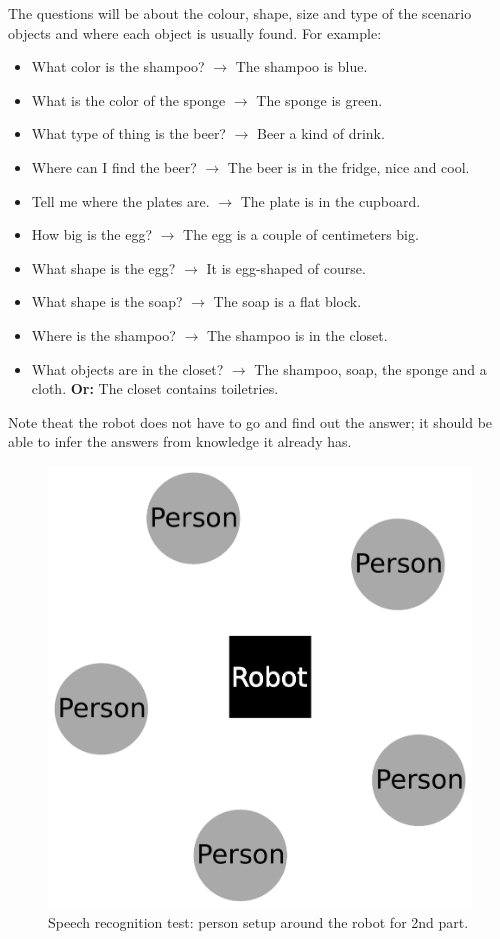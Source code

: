 The questions will be about the colour, shape, size and type of the scenario objects  and where each object is usually found. 
For example:
\begin{itemize}
 \item What color is the shampoo? $\rightarrow$ The shampoo is blue.
 \item What is the color of the sponge $\rightarrow$ The sponge is green.
 \item What type of thing is the beer? $\rightarrow$ Beer a kind of drink. 
 \item Where can I find the beer? $\rightarrow$ The beer is in the fridge, nice and cool. 
 \item Tell me where the plates are. $\rightarrow$ The plate is in the cupboard. 
 \item How big is the egg? $\rightarrow$ The egg is a couple of centimeters big.
 \item What shape is the egg? $\rightarrow$ It is egg-shaped of course. 
 \item What shape is the soap? $\rightarrow$ The soap is a flat block. 
 \item Where is the shampoo? $\rightarrow$ The shampoo is in the closet. 
 \item What objects are in the closet? $\rightarrow$ The shampoo, soap, the sponge and a cloth. \textbf{Or:} The closet contains toiletries.
\end{itemize}
Note theat the robot does not have to go and find out the answer; it should be able to infer the answers from knowledge it already has. 

\begin{figure}[!h]
	\centering
	\includegraphics[width=0.5\columnwidth]{images/asrsetup.pdf}
	\caption{Speech recognition test: person setup around the robot for 2nd part.}
	\label{fig:asrsetup}
\end{figure}



